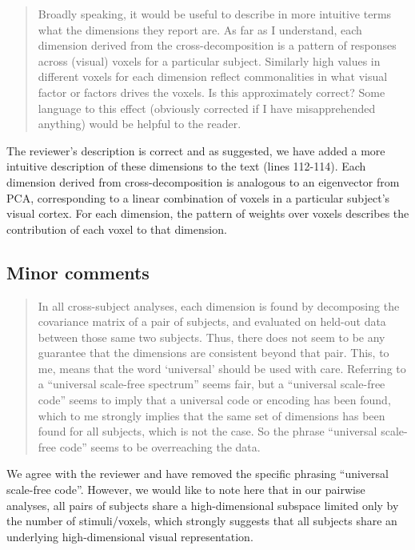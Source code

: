 \documentclass[10pt]{article}
\begin{document}
\begin{quote}
Broadly speaking, it would be useful to describe in more intuitive terms what the dimensions they report are. As far as I understand, each dimension derived from the cross-decomposition is a pattern of responses across (visual) voxels for a particular subject. Similarly high values in different voxels for each dimension reflect commonalities in what visual factor or factors drives the voxels. Is this approximately correct? Some language to this effect (obviously corrected if I have misapprehended anything) would be helpful to the reader.
\end{quote}

The reviewer's description is correct and as suggested, we have added a more intuitive description of these dimensions to the text (lines 112-114). Each dimension derived from cross-decomposition is analogous to an eigenvector from PCA, corresponding to a linear combination of voxels in a particular subject's visual cortex. For each dimension, the pattern of weights over voxels describes the contribution of each voxel to that dimension.

\subsection{Minor comments}\label{minor-comments}

\begin{quote}
In all cross-subject analyses, each dimension is found by decomposing the covariance matrix of a pair of subjects, and evaluated on held-out data between those same two subjects. Thus, there does not seem to be any guarantee that the dimensions are consistent beyond that pair. This, to me, means that the word `universal' should be used with care. Referring to a ``universal scale-free spectrum'' seems fair, but a ``universal scale-free code'' seems to imply that a universal code or encoding has been found, which to me strongly implies that the same set of dimensions has been found for all subjects, which is not the case. So the phrase ``universal scale-free code'' seems to be overreaching the data.
\end{quote}

We agree with the reviewer and have removed the specific phrasing ``universal scale-free code''. However, we would like to note here that in our pairwise analyses, all pairs of subjects share a high-dimensional subspace limited only by the number of stimuli/voxels, which strongly suggests that all subjects share an underlying high-dimensional visual representation.
\end{document}
